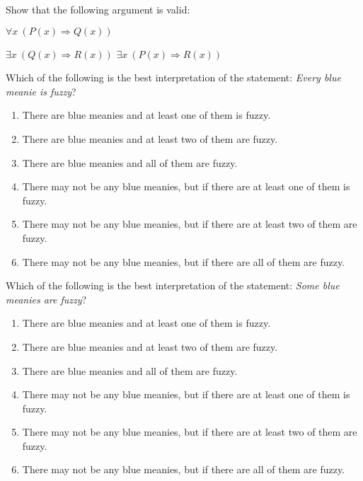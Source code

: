\begin{exercise}
Show that the following argument is valid:
{\setlength\linwid{1.7in}
\begin{centeredarg}
\item $\forall x\ (P(x)\Rightarrow Q(x))$
\item $\exists x\ (Q(x)\Rightarrow R(x))$
\hence $\exists x\ (P(x)\Rightarrow R(x))$
\end{centeredarg}}
\end{exercise}

\begin{exercise}
Which of the following is the best interpretation of the statement: \emph{Every blue meanie is fuzzy}?
\begin{enumerate}
\item There are blue meanies and at least one of them is fuzzy.
\item There are blue meanies and at least two of them are fuzzy.
\item There are blue meanies and all of them are fuzzy.
\item There may not be any blue meanies, but if there are at least one of them is fuzzy.
\item There may not be any blue meanies, but if there are at least two of them are fuzzy.
\item There may not be any blue meanies, but if there are all of them are fuzzy.
\end{enumerate}
\end{exercise}

\begin{exercise}
Which of the following is the best interpretation of the statement: \emph{Some blue meanies are fuzzy}?
\begin{enumerate}
\item There are blue meanies and at least one of them is fuzzy.
\item There are blue meanies and at least two of them are fuzzy.
\item There are blue meanies and all of them are fuzzy.
\item There may not be any blue meanies, but if there are at least one of them is fuzzy.
\item There may not be any blue meanies, but if there are at least two of them are fuzzy.
\item There may not be any blue meanies, but if there are all of them are fuzzy.
\end{enumerate}
\end{exercise}

